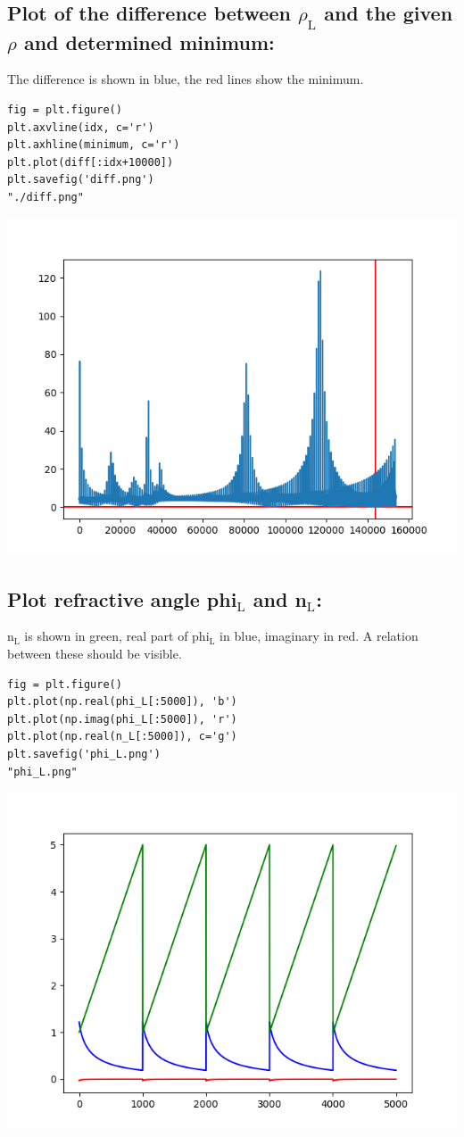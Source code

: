 \documentclass[11pt]{article}
\begin{document}
\subsection{Plot of the difference between \(\rho_{\text{L}}\) and the given \(\rho\) and determined minimum:}
\label{sec:org2c6ddbd}

The difference is shown in blue, the red lines show the minimum.

\begin{verbatim}
fig = plt.figure()
plt.axvline(idx, c='r')
plt.axhline(minimum, c='r')
plt.plot(diff[:idx+10000])
plt.savefig('diff.png')
"./diff.png"
\end{verbatim}

\begin{center}
\includegraphics[width=.9\linewidth]{./diff.png}
\end{center}

\subsection{Plot refractive angle phi\(_{\text{L}}\) and n\(_{\text{L}}\):}
\label{sec:orgf4eb4db}

n\(_{\text{L}}\) is shown in green, real part of phi\(_{\text{L}}\) in blue, imaginary in red. 
A relation between these should be visible.

\begin{verbatim}
fig = plt.figure()
plt.plot(np.real(phi_L[:5000]), 'b')
plt.plot(np.imag(phi_L[:5000]), 'r')
plt.plot(np.real(n_L[:5000]), c='g')
plt.savefig('phi_L.png')
"phi_L.png"
\end{verbatim}

\begin{center}
\includegraphics[width=.9\linewidth]{phi_L.png}
\end{center}


\end{document}
